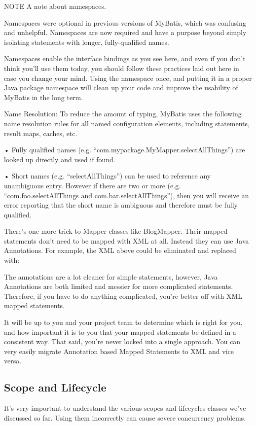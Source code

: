 NOTE A note about namespaces.

Namespaces were optional in previous versions of MyBatis, which was confusing and unhelpful. Namespaces are now required and have a purpose beyond simply isolating statements with longer, fully-qualified names.

Namespaces enable the interface bindings as you see here, and even if you don’t think you’ll use them today, you should follow these practices laid out here in case you change your mind. Using the namespace once, and putting it in a proper Java package namespace will clean up your code and improve the usability of MyBatis in the long term.

Name Resolution: To reduce the amount of typing, MyBatis uses the following name resolution rules for all named configuration elements, including statements, result maps, caches, etc.

•	Fully qualified names (e.g. “com.mypackage.MyMapper.selectAllThings”) are looked up directly and used if found.

•	Short names (e.g. “selectAllThings”) can be used to reference any unambiguous entry. However if there are two or more (e.g. “com.foo.selectAllThings and com.bar.selectAllThings”), then you will receive an error reporting that the short name is ambiguous and therefore must be fully qualified.


There's one more trick to Mapper classes like BlogMapper. Their mapped statements don't need to be mapped with XML at all. Instead they can use Java Annotations. For example, the XML above could be eliminated and replaced with:



The annotations are a lot cleaner for simple statements, however, Java Annotations are both limited and messier for more complicated statements. Therefore, if you have to do anything complicated, you're better off with XML mapped statements.

It will be up to you and your project team to determine which is right for you, and how important it is to you that your mapped statements be defined in a consistent way. That said, you're never locked into a single approach. You can very easily migrate Annotation based Mapped Statements to XML and vice versa.
\subsection{Scope and Lifecycle}
It's very important to understand the various scopes and lifecycles classes we've discussed so far. Using them incorrectly can cause severe concurrency problems.
